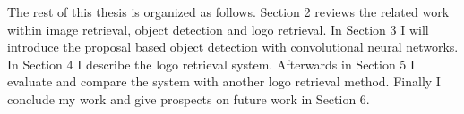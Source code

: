 The rest of this thesis is organized as follows. Section 2 reviews the related work within image retrieval, object detection and logo retrieval. In Section 3 I will introduce the proposal based object detection with convolutional neural networks. In Section 4 I describe the logo retrieval system. Afterwards in Section 5 I evaluate and compare the system with another logo retrieval method. Finally I conclude my work and give prospects on future work in Section 6.
